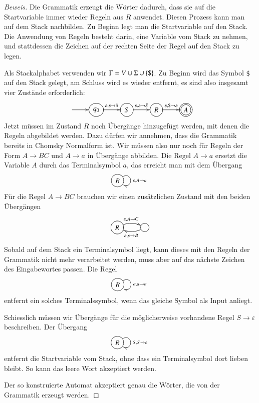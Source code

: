 \begin{proof}[Beweis]
Die Grammatik erzeugt die Wörter dadurch, dass sie auf die Startvariable
immer wieder Regeln aus $R$ anwendet.
Diesen Prozess kann man auf dem
Stack nachbilden.
Zu Beginn legt man die Startvariable auf den Stack.
Die Anwendung von Regeln besteht darin, eine Variable vom Stack zu nehmen,
und stattdessen die Zeichen auf der rechten Seite der Regel
auf den Stack zu legen.

Als Stackalphabet verwenden wir $\Gamma = V\cup \Sigma \cup \{{\tt \$}\}$.
Zu Beginn wird das Symbol {\tt\$} auf den Stack gelegt, am Schluss wird 
es wieder entfernt, es sind also insgesamt vier Zustände erforderlich:
\[
\entrymodifiers={++[o][F]}
\xymatrix{
*+\txt{}\ar[r]
	&{q_0} \ar[r]^{\varepsilon,\varepsilon\to{\tt\$}}
		&{S}\ar[r]^{\varepsilon,\varepsilon\to S}
			&{R}\ar[r]^{\varepsilon,{\tt\$}\to\varepsilon}
				&*++[o][F=]{A}
}
\]
Jetzt müssen im Zustand $R$ noch Übergänge hinzugefügt werden, mit denen
die Regeln abgebildet werden.
Dazu dürfen wir annehmen, dass die Grammatik bereits in Chomsky Normalform
ist.
Wir müssen also nur noch für Regeln der Form $A\to BC$ und $A\to a$
in Übergänge abbilden.
Die Regel $A\to a$ ersetzt die Variable $A$
durch das Terminalsymbol $a$, das erreicht man mit dem Übergang
\[
\entrymodifiers={++[o][F]}
\xymatrix{
{R}\ar@(ur,dr)^{\varepsilon,A\to a}
}
\]
Für die Regel $A\to BC$ brauchen wir einen zusätzlichen Zustand mit
den beiden Übergängen
\[
\entrymodifiers={++[o][F]}
\xymatrix{
R\ar@/^/[r]^{\varepsilon,A\to C}
	&{}\ar@/^/[l]^{\varepsilon,\varepsilon\to B}
}
\]
Sobald auf dem Stack ein Terminalsymbol liegt, kann dieses mit
den Regeln der Grammatik nicht mehr verarbeitet werden, muss 
aber auf das nächste Zeichen des Eingabewortes passen.
Die Regel
\[
\entrymodifiers={++[o][F]}
\xymatrix{
{R}\ar@(ur,dr)^{a,a\to\varepsilon}
}
\]
entfernt ein solches Terminalssymbol, wenn das gleiche Symbol
als Input anliegt.

Schiesslich müssen wir Übergänge für die möglicherweise vorhandene
Regel $S\to\varepsilon$ beschreiben.
Der Übergang 
\[
\entrymodifiers={++[o][F]}
\xymatrix{
{R}\ar@(ur,dr)^{S,S\to\varepsilon}
}
\]
entfernt die Startvariable vom Stack, ohne dass ein Terminalsymbol dort
lieben bleibt.
So kann das leere Wort akzeptiert werden.

Der so konstruierte Automat akzeptiert genau die
Wörter, die von der Grammatik erzeugt werden.
\end{proof}

